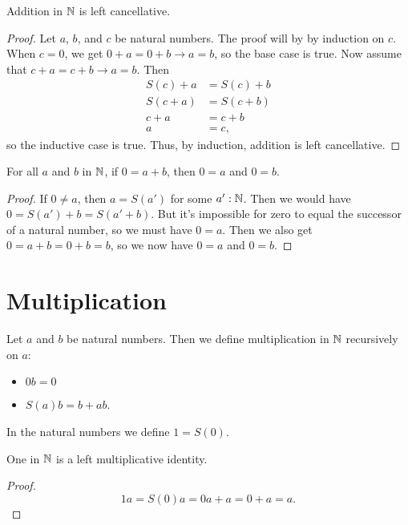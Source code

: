 \documentclass[../../math.tex]{subfiles}
\begin{document}
\begin{instance}
    Addition in $\mathbb{N}$ is left cancellative.
\end{instance}
\begin{proof}
    Let $a$, $b$, and $c$ be natural numbers.  The proof will by by induction on
    $c$.  When $c = 0$, we get $0 + a = 0 + b \rightarrow a = b$, so the base
    case is true.  Now assume that $c + a = c + b \rightarrow a = b$.  Then
    \begin{align*}
        S(c) + a &= S(c) + b \\
        S(c + a) &= S(c + b) \\
        c + a &= c + b \\
        a &= c,
    \end{align*}
    so the inductive case is true.  Thus, by induction, addition is left
    cancellative.
\end{proof}

\begin{theorem}
    For all $a$ and $b$ in $\mathbb{N}$, if $0 = a + b$, then $0 = a$ and $0 = b$.
\end{theorem}
\begin{proof}
    If $0 \neq a$, then $a = S(a')$ for some $a' : \mathbb{N}$.  Then we would have $0 =
    S(a') + b = S(a' + b)$.  But it's impossible for zero to equal the successor
    of a natural number, so we must have $0 = a$.  Then we also get $0 = a + b =
    0 + b = b$, so we now have $0 = a$ and $0 = b$.
\end{proof}

\section{Multiplication}

\begin{instance}
    Let $a$ and $b$ be natural numbers.  Then we define multiplication in $\mathbb{N}$
    recursively on $a$:
    \begin{itemize}
        \item $0b = 0$
        \item $S(a)b = b + ab$.
    \end{itemize}
\end{instance}

\begin{instance}
    In the natural numbers we define $1 = S(0)$.
\end{instance}

\begin{instance}
    One in $\mathbb{N}$ is a left multiplicative identity.
\end{instance}
\begin{proof}
    \[
        1a = S(0)a = 0a + a = 0 + a = a.
    \]
\end{proof}
\end{document}
